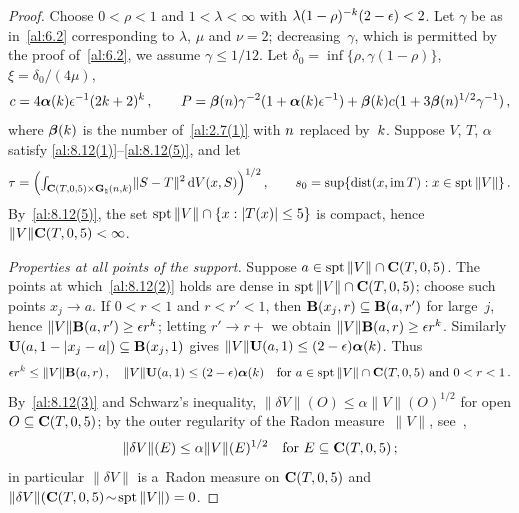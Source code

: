 \begin{proof}
    Choose $0 < \rho < 1$ and $1 < \lambda < \infty$ with $\lambda (1 - \rho)^{-k} (2 -
    \epsilon) < 2$. Let $\gamma$ be as in~\ref{al:6.2} corresponding to $\lambda$, $\mu$ and $\nu =
    2$; decreasing~$\gamma$, which is permitted by the proof of~\ref{al:6.2}, we assume $\gamma \le
    1/12$. Let $\delta_0 = \inf \{ \rho, \gamma (1 - \rho) \}$, $\xi = \delta_0 / (4 \mu)$,
    \begin{gather*}
        c = 4 \boldsymbol{\alpha}(k) \epsilon^{-1} (2 k + 2)^{k} \,, \qquad P =
        \boldsymbol{\beta}(n) \gamma^{-2} (1 + \boldsymbol{\alpha}(k) \epsilon^{-1}) +
        \boldsymbol{\beta}(k) c (1 + 3 \boldsymbol{\beta}(n)^{1/2} \gamma^{-1}) \,,
    \end{gather*}
    where $\boldsymbol{\beta}(k)$ is the number of~\ref{al:2.7(1)} with $n$ replaced by~$k$.
    Suppose $V$, $T$, $\alpha$ satisfy \ref{al:8.12(1)}--\ref{al:8.12(5)}, and let
    \begin{displaymath}
        \tau = \Big( {\textstyle\int_{\mathbf{C} ( T, 0, 5 ) \times \mathbf{G}_{\natural}(n,k)}^{}} \|S - T\|^2 \,\mathrm{d}
        V(x,S) \Big)^{1/2} \,, \qquad s_0 = \sup \{ \operatorname{dist}(x, \operatorname{im} T) : x \in \operatorname{spt} \|V\| \} \,.
    \end{displaymath}
    By~\ref{al:8.12(5)}, the set $\operatorname{spt} \|V\| \cap \{ x : |T(x)| \le 5 \}$ is compact, hence
    $\|V\| \mathbf{C} ( T, 0, 5 ) < \infty$.

    \emph{Properties at all points of the support.} Suppose $a \in \operatorname{spt} \|V\| \cap
    \mathbf{C} ( T, 0, 5 )$. The points at which~\ref{al:8.12(2)} holds are dense in $\operatorname{spt} \|V\| \cap
    \mathbf{C} ( T, 0, 5 )$; choose such points $x_j \to a$. If $0 < r < 1$ and $r < r' < 1$, then
    $\mathbf{B}(x_j,r) \subseteq \mathbf{B}(a,r')$ for large~$j$, hence $\|V\| \mathbf{B}(a,r') \ge
    \epsilon r^{k}$; letting $r' \to r+$ we obtain $\|V\| \mathbf{B}(a,r) \ge \epsilon r^{k}$.
    Similarly $\mathbf{U}(a,1 - |x_j - a|) \subseteq \mathbf{B}(x_j,1)$ gives $\|V\| \mathbf{U}(a,1) \le (2
    - \epsilon) \boldsymbol{\alpha}(k)$. Thus
    \begin{equation}
        \label{eq:8.12:a}
        \epsilon r^{k} \le \|V\| \mathbf{B}(a,r) \,, \quad \|V\| \mathbf{U}(a,1) \le (2 - \epsilon)
        \boldsymbol{\alpha}(k) \quad \text{for $a \in \operatorname{spt} \|V\| \cap \mathbf{C} ( T, 0, 5 )$ and $0 < r <
        1$} \,.
    \end{equation}
    By~\ref{al:8.12(3)} and Schwarz's inequality, $\|\delta V\|(O) \le \alpha \|V\|(O)^{1/2}$ for
    open $O \subseteq \mathbf{C} ( T, 0, 5 )$; by the outer regularity of the Radon measure~$\|V\|$,
    see~\cite[2.2.5]{Federer1969},
    \begin{equation}
        \label{eq:8.12:b}
        \|\delta V\|(E) \le \alpha \|V\|(E)^{1/2} \quad \text{for $E \subseteq \mathbf{C} ( T, 0, 5 )$} \,;
    \end{equation}
    in particular $\|\delta V\|$ is a~Radon measure on $\mathbf{C} ( T, 0, 5 )$ and $\|\delta V\|
    (\mathbf{C} ( T, 0, 5 ) \!\sim\! \operatorname{spt} \|V\|) = 0$.


\end{proof}
